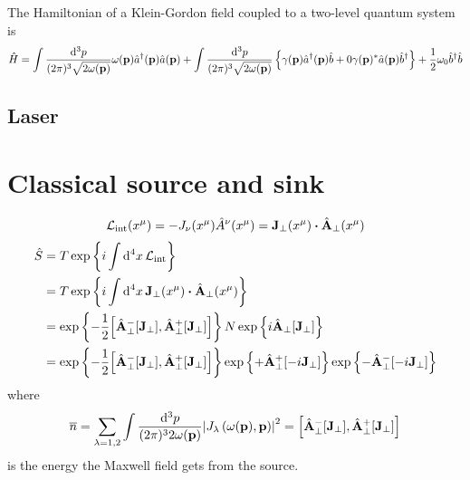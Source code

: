 \begin{example}
	The Hamiltonian of a Klein-Gordon field coupled to a two-level quantum system is
	\begin{equation}
		\hat{H}
		=
		\int\frac{\dd[3]{p}}{(2\pi)^3\sqrt{2\omega(\vb{p})}}
		\omega(\vb{p})
		\hat{a}^\dagger(\vb{p})
		\hat{a}(\vb{p})
		+
		\int\frac{\dd[3]{p}}{(2\pi)^3\sqrt{2\omega(\vb{p})}}
		\left\{
			\gamma(\vb{p})
			\hat{a}^\dagger(\vb{p})
			\hat{b}
			+0
			\gamma(\vb{p})^*
			\hat{a}(\vb{p})
			\hat{b}^\dagger
		\right\}
		+
		\frac{1}{2}
		\omega_0
		\hat{b}^\dagger
		\hat{b}
	\end{equation}
\end{example}

\subsection{Laser}

\section{Classical source and sink}

\begin{equation}
	\mathcal{L}_\text{int}(x^\mu)
	=
	-
	J_\nu(x^\mu)
	\hat{A}^\nu(x^\mu)
	=
	\vb{J}_\perp(x^\mu)
	\vdot
	\hat{\vb{A}}_\perp(x^\mu)
\end{equation}
\begin{equation}
	\begin{split}
		\hat{S}
		&=
		T
		\exp\left\{
			i
			\int\dd[4]{x}
			\mathcal{L}_\text{int}
		\right\}
		\\
		&=
		T
		\exp\left\{
			i
			\int\dd[4]{x}
			\vb{J}_\perp(x^\mu)
			\vdot
			\hat{\vb{A}}_\perp(x^\mu)
		\right\}
		\\
		&=
		\exp\left\{
			-
			\frac{1}{2}
			\comm{\hat{\vb{A}}_\perp^-[\vb{J}_\perp]}{\hat{\vb{A}}_\perp^+[\vb{J}_\perp]}
		\right\}
		N\exp\left\{
			i
			\hat{\vb{A}}_\perp[\vb{J}_\perp]
		\right\}
		\\
		&=
		\exp\left\{
			-
			\frac{1}{2}
			\comm{\hat{\vb{A}}_\perp^-[\vb{J}_\perp]}{\hat{\vb{A}}_\perp^+[\vb{J}_\perp]}
		\right\}
		\exp\left\{
			+
			\hat{\vb{A}}_\perp^+[-i\vb{J}_\perp]
		\right\}
		\exp\left\{
			-
			\hat{\vb{A}}_\perp^-[-i\vb{J}_\perp]
		\right\}
	\end{split}
\end{equation}
where
\begin{equation}
	\overline{n}
	=
	\sum_{\lambda=1,2}
	\int\frac{\dd[3]{p}}{(2\pi)^32\omega(\vb{p})}
	\abs{J_\lambda\left(\omega(\vb{p}),\vb{p}\right)}^2
	=
	\comm{\hat{\vb{A}}_\perp^-[\vb{J}_\perp]}{\hat{\vb{A}}_\perp^+[\vb{J}_\perp]}
\end{equation}
is the energy the Maxwell field gets from the source.

